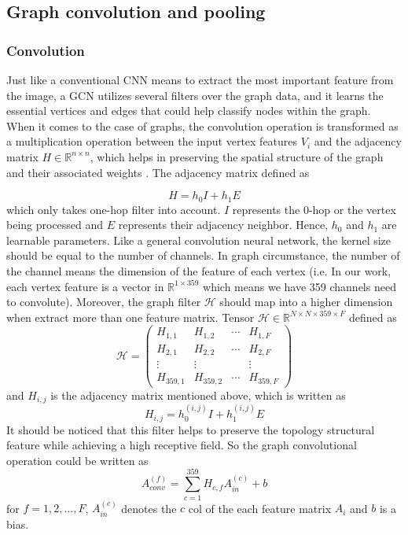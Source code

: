 \documentclass[11pt]{article}
\begin{document}
\subsection{Graph convolution and pooling}
\subsubsection{Convolution}
Just like a conventional CNN means to extract the most important feature from the image, a GCN utilizes several filters over the graph data, and it learns the essential vertices and edges that could help classify nodes within the graph. When it comes to the case of graphs, the convolution operation is transformed as a multiplication operation between the input vertex features $V_i$ and the adjacency matrix $H\in\mathbb{R}^{n\times n}$, which helps in preserving the spatial structure of the graph and their associated weights \cite{Petroski2017Robust}. The adjacency matrix defined as 

\begin{equation}
	H=h_0I+h_1E
\end{equation}
which only takes one-hop filter into account. $I$ represents the 0-hop or the vertex being processed and $E$ represents their adjacency neighbor. Hence, $h_0$ and $h_1$ are learnable parameters. Like a general convolution neural network, the kernel size should be equal to the number of channels. In graph circumstance, the number of the channel means the dimension of the feature of each vertex (i.e. In our work, each vertex feature is a vector in $\mathbb{R}^{1\times 359}$ which means we have 359 channels need to convolute). Moreover, the graph filter $\mathcal{H}$ should map into a higher dimension when extract more than one feature matrix. Tensor $\mathcal{H}\in\mathbb{R}^{N\times N\times359\times F}$ defined as
\begin{equation}
	\mathcal{H} = \begin{pmatrix} H_{1,1} & H_{1,2}  & \cdots &  H_{1,F}\\ 
	 H_{2,1} & H_{2,2}  & \cdots &  H_{2,F}\\
	\vdots &\vdots &&\vdots\\
	 H_{359,1} & H_{359,2}  & \cdots &  H_{359,F}\end{pmatrix}
\end{equation}
and $H_{i,j}$ is the adjacency matrix mentioned above, which is written as
\begin{equation}
	H_{i,j}=h_0^{(i,j)}I+h_1^{(i,j)}E
\end{equation}
It should be noticed that this filter helps to preserve the topology structural feature while achieving a high receptive field. So the graph convolutional operation could be written as 
\begin{equation}
	A_{conv}^{(f)}=\sum_{c=1}^{359}H_{c,f}A_{in}^{(c)}+b
\end{equation}
for $f=1,2,\dots,F$, $A_{in}^{(c)}$ denotes the $c$ col of the each feature matrix $A_i$ and $b$ is a bias.
\end{document}
